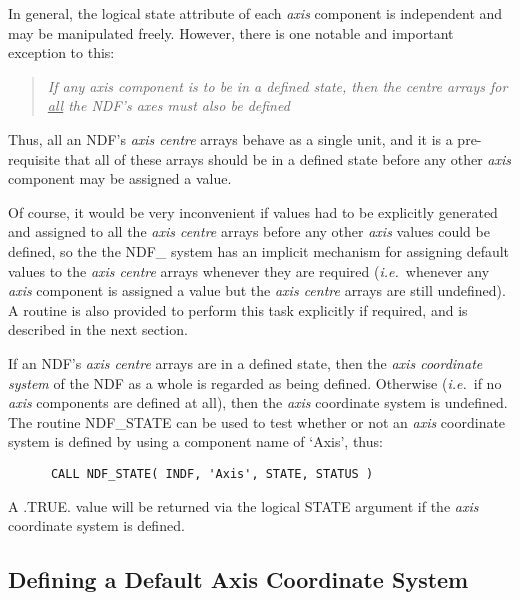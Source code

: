 \documentclass[twoside,11pt]{article}
\newcommand{\htmlref}[2]{#1}
\newcommand{\xlabel}[1]{}
\newcommand{\st}[1]{{\em{#1}}}
\begin{document}
In general, the logical state attribute of each \st{axis\/} component is
independent and may be manipulated freely. 
However, there is one notable and important exception to this: 

\begin{quote}
\begin{center}
\st{If any \st{axis\/} component is to be in a defined state, then the
\st{centre\/} arrays for \underline{all} the NDF's \st{axes} must also be 
defined}
\end{center}
\end{quote}

Thus, all an NDF's \st{axis centre\/} arrays behave as a single unit, and
it is a pre-requisite that all of these arrays should be in a defined state
before any other \st{axis\/} component may be assigned a value. 

Of course, it would be very inconvenient if values had to be explicitly
generated and assigned to all the \st{axis centre\/} arrays before any
other \st{axis\/} values could be defined, so the the NDF\_ system has an
implicit mechanism for assigning default values to the \st{axis centre\/}
arrays whenever they are required (\st{i.e.}\ whenever any \st{axis\/}
component is assigned a value but the \st{axis centre\/} arrays are still
undefined). 
A routine is also provided to perform this task explicitly if required, and
is described in the next section. 

If an NDF's \st{axis centre\/} arrays are in a defined state, then the
\st{axis coordinate system\/} of the NDF as a whole is regarded as
being 
defined. 
Otherwise (\st{i.e.}\ if no \st{axis\/} components are defined at all),
then the \st{axis\/} coordinate system is undefined. 
The routine \htmlref{NDF\_STATE}{NDF_STATE} can be used to test whether or not an \st{axis\/}
coordinate system is defined by using a component name of `Axis', thus: 

\small
\begin{verbatim}
      CALL NDF_STATE( INDF, 'Axis', STATE, STATUS )
\end{verbatim}
\normalsize

A .TRUE. value will be returned via the logical STATE argument if the
\st{axis\/} coordinate system is defined. 

\subsection{\xlabel{defining_a_default_axis_coordinate_system}\label{ss:acre}Defining a Default Axis Coordinate System}
\end{document}

